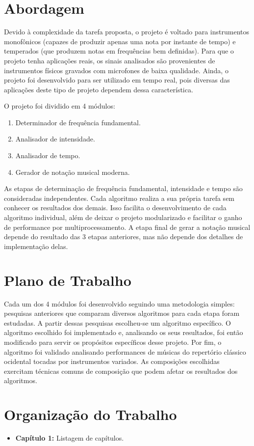 \section{Abordagem}

Devido à complexidade da tarefa proposta, o projeto é voltado para instrumentos monofônicos (capazes de produzir apenas uma nota por instante de tempo) e temperados (que produzem notas em frequências bem definidas). Para que o projeto tenha aplicações reais, os sinais analisados são provenientes de instrumentos físicos gravados com microfones de baixa qualidade. Ainda, o projeto foi desenvolvido para ser utilizado em tempo real, pois diversas das aplicações deste tipo de projeto dependem dessa característica.

O projeto foi dividido em 4 módulos:

\begin{enumerate}
	\item Determinador de frequência fundamental.
	\item Analisador de intensidade.
	\item Analisador de tempo.
	\item Gerador de notação musical moderna.
\end{enumerate}

As etapas de determinação de frequência fundamental, intensidade e tempo são consideradas independentes. Cada algoritmo realiza a sua própria tarefa sem conhecer os resultados dos demais. Isso facilita o desenvolvimento de cada algoritmo individual, além de deixar o projeto modularizado e facilitar o ganho de performance por multiprocessamento. A etapa final de gerar a notação musical depende do resultado das 3 etapas anteriores, mas não depende dos detalhes de implementação delas.

\section{Plano de Trabalho}
\label{sec:plano_trabalho}

Cada um dos 4 módulos foi desenvolvido seguindo uma metodologia simples: pesquisas anteriores que comparam diversos algoritmos para cada etapa foram estudadas. A partir dessas pesquisas escolheu-se um algoritmo específico. O algoritmo escolhido foi implementado e, analisando os seus resultados, foi então modificado para servir os propósitos específicos desse projeto. Por fim, o algoritmo foi validado analisando performances de músicas do repertório clássico ocidental tocadas por instrumentos variados. As composições escolhidas exercitam técnicas comuns de composição que podem afetar os resultados dos algoritmos.

\section{Organização do Trabalho}

\begin{itemize}
	\item \textbf{Capítulo 1:} Listagem de capítulos.
\end{itemize}
